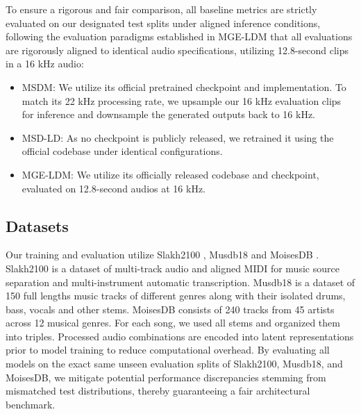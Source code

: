 \documentclass[lettersize,journal]{IEEEtran}
\begin{document}
To ensure a rigorous and fair comparison, all baseline metrics are strictly evaluated on our designated test splits under aligned inference conditions, following the evaluation paradigms established in  MGE-LDM \cite{chae2025mge} that all evaluations are rigorously aligned to identical audio specifications, utilizing 12.8-second clips in a 16 kHz audio:
\begin{itemize}
    \item MSDM: We utilize its official pretrained checkpoint and implementation. To match its 22 kHz processing rate, we upsample our 16 kHz evaluation clips for inference and downsample the generated outputs back to 16 kHz.
    \item MSD-LD: As no checkpoint is publicly released, we retrained it using the official codebase under identical configurations.
    \item MGE-LDM: We utilize its officially released codebase and checkpoint, evaluated on 12.8-second audios at 16 kHz.
\end{itemize}

\subsection{Datasets }
Our training and evaluation utilize Slakh2100 \cite{manilow2019cutting}, Musdb18 \cite{MUSDB18HQ} and MoisesDB \cite{pereira2023MoisesDB}. Slakh2100 is a dataset of multi-track audio and aligned MIDI for music source separation and multi-instrument automatic transcription. Musdb18 is a dataset of 150 full lengths music tracks of different genres along with their isolated drums, bass, vocals and other stems. MoisesDB consists of 240 tracks from 45 artists across 12 musical genres. For each song, we used all stems and organized them into triples. Processed audio combinations are encoded into latent representations prior to model training to reduce computational overhead. By evaluating all models on the exact same unseen evaluation splits of Slakh2100, Musdb18, and MoisesDB, we mitigate potential performance discrepancies stemming from mismatched test distributions, thereby guaranteeing a fair architectural benchmark.
\end{document}

